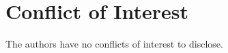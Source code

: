 \documentclass[10pt,twoside,reqno]{article}
\begin{document}









\section*{Conflict of Interest}
The authors have no conflicts of interest to disclose.

\newpage
{}

\nocite{*}
\end{document}
